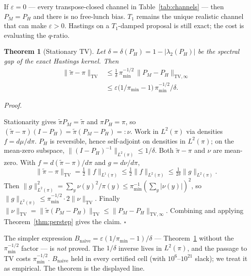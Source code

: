 \documentclass[aps,prx,reprint,floatfix,amsmath,amssymb,amsfonts]{revtex4-2}
\newtheorem{theorem}{Theorem}
\newenvironment{proof}[1][Proof]{%
  \par\medskip\noindent\textit{#1.}\ignorespaces
}{%
  \unskip\nobreak\hfill$\square$\par\medskip
}
\begin{document}
If $\varepsilon=0$ --- every transpose-closed channel in
Table~\ref{tab:channels} --- then $P_M=P_H$ and there is no free-lunch
bias. $T_1$ remains the unique realistic channel that can make
$\varepsilon>0$. Hastings on a $T_1$-damped proposal is still exact; the
cost is evaluating the $q$-ratio.

\begin{theorem}[Stationary TV]
\label{thm:stationary}
Let $\delta = \delta(P_H) = 1-|\lambda_2(P_H)|$ be the spectral gap of
the exact Hastings kernel. Then
\begin{align}
  \|\tilde\pi - \pi\|_{\mathrm{TV}}
  &\le
  \frac{1}{\delta}\, \pi_{\min}^{-1/2}\, \|P_M-P_H\|_{\mathrm{TV},\infty}
  \nonumber\\
  &\le
  \varepsilon \bigl(1/\pi_{\min}-1\bigr)\, \pi_{\min}^{-1/2}/\delta.
\end{align}
\end{theorem}

\begin{proof}
Stationarity gives $\tilde\pi P_M = \tilde\pi$ and $\pi P_H = \pi$, so
$(\tilde\pi-\pi)(I-P_H) = \tilde\pi(P_M-P_H) =: \nu$. Work in
$L^2(\pi)$ via densities $f = d\mu/d\pi$. $P_H$ is reversible, hence
self-adjoint on densities in $L^2(\pi)$; on the mean-zero subspace,
$\|(I-P_H)^{-1}\|_{L^2(\pi)} \le 1/\delta$. Both $\tilde\pi-\pi$ and
$\nu$ are mean-zero. With $f = d(\tilde\pi-\pi)/d\pi$ and
$g = d\nu/d\pi$,
\begin{equation}
  \|\tilde\pi-\pi\|_{\mathrm{TV}}
  =
  \tfrac12 \|f\|_{L^1(\pi)}
  \le
  \tfrac12 \|f\|_{L^2(\pi)}
  \le
  \tfrac{1}{2\delta}\|g\|_{L^2(\pi)}.
\end{equation}
Then
$\|g\|_{L^2(\pi)}^2 = \sum_y \nu(y)^2/\pi(y) \le \pi_{\min}^{-1}(\sum_y|\nu(y)|)^2$,
so $\|g\|_{L^2(\pi)} \le \pi_{\min}^{-1/2}\cdot 2\|\nu\|_{\mathrm{TV}}$.
Finally
$\|\nu\|_{\mathrm{TV}} = \|\tilde\pi(P_M-P_H)\|_{\mathrm{TV}} \le \|P_M-P_H\|_{\mathrm{TV},\infty}$.
Combining and applying Theorem~\ref{thm:perstep} gives the claim.
\end{proof}

The simpler expression
$B_{\mathrm{naive}} = \varepsilon(1/\pi_{\min}-1)/\delta$ ---
Theorem~\ref{thm:stationary} without the $\pi_{\min}^{-1/2}$ factor ---
is \emph{not} proved. The $1/\delta$ inverse lives in $L^2(\pi)$, and
the passage to TV costs $\pi_{\min}^{-1/2}$. $B_{\mathrm{naive}}$ held
in every certified cell (with $10^6$--$10^{21}$ slack); we treat it as
empirical. The theorem is the displayed line.
\end{document}
